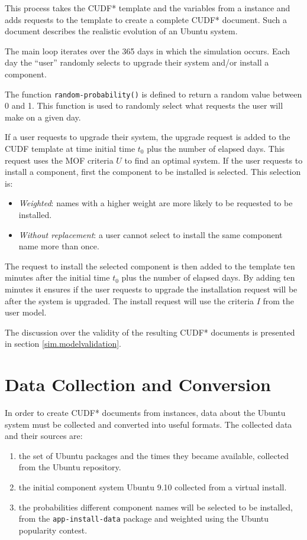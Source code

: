 This process takes the CUDF* template and the variables from a \usermodel instance and adds requests to the template to  create a complete CUDF* document.
Such a document describes the realistic evolution of an Ubuntu system.

The main loop iterates over the 365 days in which the simulation occurs.
Each day the ``user'' randomly selects to upgrade their system and/or install a component.

The function \texttt{random-probability()} is defined to return a random value between 0 and 1.
This function is used to randomly select what requests the user will make on a given day.

If a user requests to upgrade their system, the upgrade request is added to the CUDF template at time initial time $t_0$ plus the number of elapsed days.
This request uses the MOF criteria $U$ to find an optimal system.
If the user requests to install a component, first the component to be installed is selected.
This selection is: 
\begin{itemize}
  \item \textit{Weighted}: names with a higher weight are more likely to be requested to be installed.
  \item \textit{Without replacement}: a user cannot select to install the same component name more than once.
\end{itemize} 
The request to install the selected component is then added to the template ten minutes after the initial time $t_0$ plus the number of elapsed days.
By adding ten minutes it ensures if the user requests to upgrade the installation request will be after the system is upgraded.
The install request will use the criteria $I$ from the user model.

The discussion over the validity of the resulting CUDF* documents is presented in section \ref{sim.modelvalidation}.

\section{\usermodel Data Collection and Conversion}
\label{sim.collection}
In order to create CUDF* documents from \usermodel instances, data about the Ubuntu system must be collected and converted into useful formats.
The collected data and their sources are:
\begin{enumerate}
  \item the set of Ubuntu packages and the times they became available, collected from the Ubuntu repository.
  \item the initial component system Ubuntu 9.10 collected from a virtual install.
  \item the probabilities different component names will be selected to be installed, from the \texttt{app-install-data} package and weighted using the Ubuntu popularity contest.
\end{enumerate}

